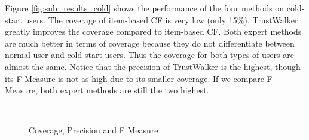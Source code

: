 \documentclass[12pt]{article}
\begin{document}
Figure \ref{fig:sub_results_cold} shows the performance of the four methods on cold-start users. The coverage of item-based CF is very low (only 15\%). TrustWalker greatly improves the coverage compared to item-based CF. Both expert methods are much better in terms of coverage because they do not differentiate between normal user and cold-start users. Thus the coverage for both types of users are almost the same. Notice that the precision of TrustWalker is the highest, though its F Measure is not as high due to its smaller coverage. If we compare F Measure, both expert methods are still the two highest.


\begin{figure}[htbp]
	\centering
	\\
	\caption{Coverage, Precision and F Measure}
	\label{fig:results_all}
\end{figure}
\end{document}
